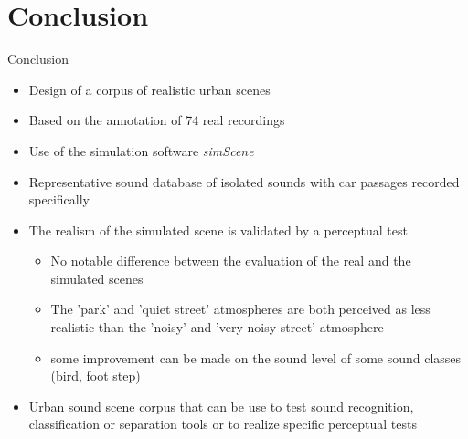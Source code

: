 \documentclass{beamer}
\begin{document}
\section{Conclusion}
\begin{frame}{Conclusion}

\begin{itemize}
\item Design of a corpus of realistic urban scenes
\item Based on the annotation of 74 real recordings
\item Use of the simulation software \textit{simScene}
\item Representative sound database of isolated sounds with car passages recorded specifically
\item The realism of the simulated scene is validated by a perceptual test
	\begin{itemize}
	\item No notable difference between the evaluation of the real and the simulated scenes
	\item The 'park' and 'quiet street' atmospheres are both perceived as less realistic than the 'noisy' and 'very noisy street' atmosphere
	\item some improvement can be made on the sound level of some sound classes (bird, foot step)
	\end{itemize}
\item Urban sound scene corpus that can be use to test sound recognition, classification or separation tools or to realize specific perceptual tests
\end{itemize}

\end{frame}

\begin{frame}

\titlepage

\end{frame}
\end{document}

